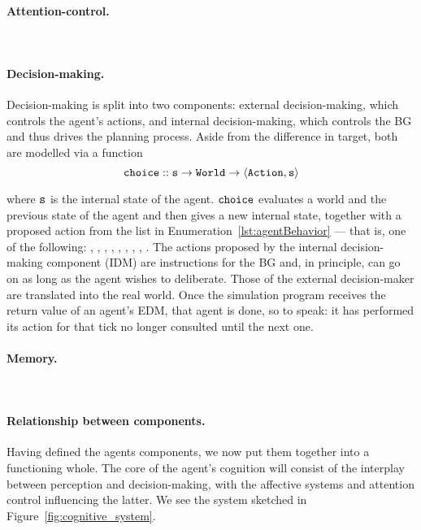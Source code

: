  

\paragraph{Attention-control.}\ \\


\paragraph{Decision-making.} Decision-making is split into two components: external decision-making, which controls the agent's actions, and internal decision-making, which controls the BG and thus drives the planning process. Aside from the difference in target, both are modelled via a function
$$
	\mathtt{choice} :: \mathtt{s \rightarrow World \rightarrow \langle Action, s \rangle}
$$

where $\mathtt{s}$ is the internal state of the agent. $\mathtt{choice}$ evaluates a world and the previous state of the agent and then gives a new internal state, together with a proposed action from the list in Enumeration~\ref{lst:agentBehavior} --- that is, one of the following: , , , , , , , , . The actions proposed by the internal decision-making component (IDM) are instructions for the BG and, in principle, can go on as long as the agent wishes to deliberate. Those of the external decision-maker are translated into the real world. Once the simulation program receives the return value of an agent's EDM, that agent is done, so to speak: it has performed its action for that tick no longer consulted until the next one.

\paragraph{Memory.}\ \\


\paragraph{Relationship between components.} Having defined the agents components, we now put them together into a functioning whole. The core of the agent's cognition will consist of the interplay between perception and decision-making, with the affective systems and attention control influencing the latter. We see the system sketched in Figure~\ref{fig:cognitive_system}.

